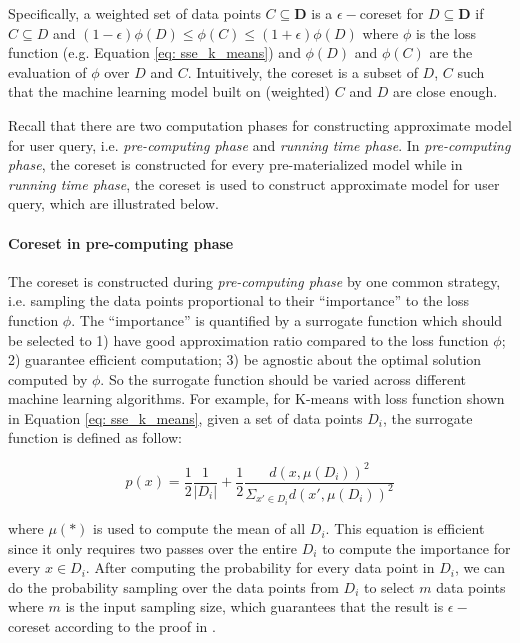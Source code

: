 Specifically, a weighted set of data points $C \subseteq \textbf{D}$ is a $\epsilon-$coreset for $D \subseteq \textbf{D}$ if $C \subseteq D$ and $(1-\epsilon)\phi(D) \leq \phi(C) \leq (1+\epsilon)\phi(D)$ where $\phi$ is the loss function (e.g. Equation \ref{eq: sse_k_means}) and $\phi(D)$ and $\phi(C)$ are the evaluation of $\phi$ over $D$ and $C$. Intuitively, the coreset is a subset of $D$, $C$ such that the machine learning model built on (weighted) $C$ and $D$ are close enough.

Recall that there are two computation phases for constructing approximate model for user query, i.e. {\em pre-computing phase} and {\em running time phase}. In {\em pre-computing phase}, the coreset is constructed for every pre-materialized model while in {\em running time phase}, the coreset is used to construct approximate model for user query, which are illustrated below.

\paragraph{Coreset in pre-computing phase} The coreset is constructed during {\em pre-computing phase} by one common strategy, i.e. sampling the data points proportional to their ``importance'' to the loss function $\phi$. The ``importance'' is quantified by a surrogate function which should be selected to 1) have good approximation ratio compared to the loss function $\phi$; 2) guarantee efficient computation; 3) be  agnostic about the optimal solution computed by $\phi$. So the surrogate function should be varied across different machine learning algorithms. For example, for K-means with loss function shown in Equation \ref{eq: sse_k_means}, given a set of data points $D_i$, the surrogate function is defined as follow:

\begin{equation}\label{eq: surrogate_function}
    p(x) = \frac{1}{2}\frac{1}{|D_i|} + \frac{1}{2}\frac{d(x, \mu(D_i))^2}{\Sigma_{x'\in D_i}d(x', \mu(D_i))^2}
\end{equation}

where $\mu(*)$ is used to compute the mean of all $D_i$. This equation is efficient since it only requires two passes over the entire $D_i$ to compute the importance for every $x \in D_i$. After computing the probability for every data point in $D_i$, we can do the probability sampling over the data points from $D_i$ to select $m$ data points where $m$ is the input sampling size, which guarantees that the result is $\epsilon-$coreset according to the proof in \cite{bachem2017scalable}.

